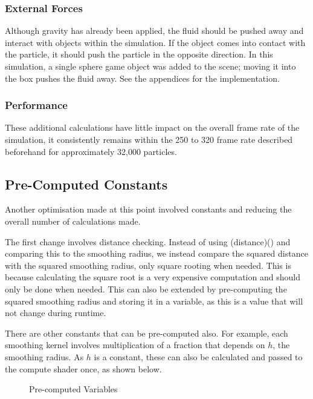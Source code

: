 \documentclass[a4paper, 12pt]{article}
\newcommand{\wideimage}[2][]{%
  \makebox[\textwidth][c]{\texttt{[image: \#2]}}%
}
\begin{document}
    \subsubsection{External Forces}

    Although gravity has already been applied, the fluid should be pushed away and interact with objects within the simulation. If the object comes into contact with the particle, it should push the particle in the opposite direction. In this simulation, a single sphere game object was added to the scene; moving it into the box pushes the fluid away. See the appendices for the implementation.

    \subsubsection{Performance}

    These additional calculations have little impact on the overall frame rate of the simulation, it consistently remains within the 250 to 320 frame rate described beforehand for approximately 32,000 particles.

    \subsection{Pre-Computed Constants}

    Another optimisation made at this point involved constants and reducing the overall number of calculations made.

    The first change involves distance checking. Instead of using \textsc(distance)() and comparing this to the smoothing radius, we instead compare the squared distance with the squared smoothing radius, only square rooting when needed. This is because calculating the square root is a very expensive computation and should only be done when needed. This can also be extended by pre-computing the squared smoothing radius and storing it in a variable, as this is a value that will not change during runtime.

    There are other constants that can be pre-computed also. For example, each smoothing kernel involves multiplication of a fraction that depends on $h$, the smoothing radius. As $h$ is a constant, these can also be calculated and passed to the compute shader once, as shown below.

    \begin{figure}[H]
        \begin{center}
            \wideimage[width=1.1\textwidth]{precomputeMults.png}
            \caption{Pre-computed Variables \cite{lague2}}
        \end{center}
    \end{figure}
\end{document}

